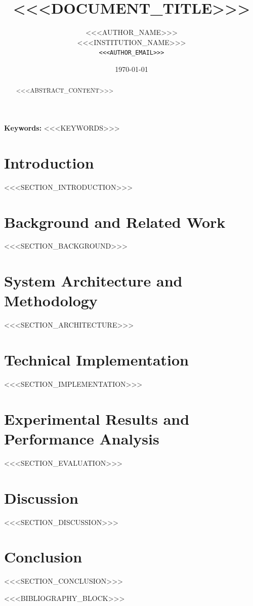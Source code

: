 \documentclass[11pt,a4paper]{article}
\title{\textbf{<<<DOCUMENT_TITLE>>>}}
\author{<<<AUTHOR_NAME>>> \\ \small <<<INSTITUTION_NAME>>> \\ \small \texttt{<<<AUTHOR_EMAIL>>>}}
\date{\today}
\begin{document}
\maketitle

\begin{abstract}
<<<ABSTRACT_CONTENT>>>
\end{abstract}

\textbf{Keywords:} <<<KEYWORDS>>>

\section{Introduction}
<<<SECTION_INTRODUCTION>>>

\section{Background and Related Work}
<<<SECTION_BACKGROUND>>>

\section{System Architecture and Methodology}
<<<SECTION_ARCHITECTURE>>>

\section{Technical Implementation}
<<<SECTION_IMPLEMENTATION>>>

\section{Experimental Results and Performance Analysis}
<<<SECTION_EVALUATION>>>

\section{Discussion}
<<<SECTION_DISCUSSION>>>

\section{Conclusion}
<<<SECTION_CONCLUSION>>>

<<<BIBLIOGRAPHY_BLOCK>>>
\end{document}
